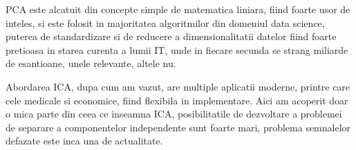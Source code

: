 \documentclass[12pt,oneside]{article}
\begin{document}
PCA este alcatuit din concepte simple de matematica liniara, fiind foarte usor de inteles, si este folosit in majoritatea algoritmilor din domeniul data science, puterea de standardizare si de reducere a dimensionalitatii datelor fiind foarte pretioasa in starea curenta a lumii IT, unde in fiecare secunda se strang miliarde de esantioane, unele relevante, altele nu. 

Abordarea ICA, dupa cum am vazut, are multiple aplicatii moderne, printre care cele medicale si economice, fiind flexibila in implementare. Aici am acoperit doar o mica parte din ceea ce inseamna ICA, posibilitatile de dezvoltare a problemei de separare a componentelor independente sunt foarte mari, problema semnalelor defazate este inca una de actualitate.  
\newpage


%

\end{document}
